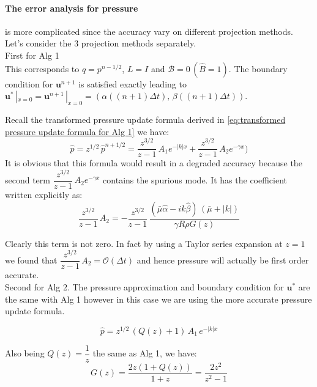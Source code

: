 \paragraph*{The error analysis for pressure} is more complicated since the accuracy vary on different projection methods. Let's consider the 3 projection methods separately.\\

First for Alg 1\\
This corresponds to $q = p^{n-1/2}$, $L = I$ and $\mathcal{B} = 0 \, (\hat{B} = 1)$. The boundary condition for $\textbf{u}^{n+1}$ is satisfied exactly leading to $\textbf{u}^*\,|_{x=0} = \textbf{u}^{n+1}\,|_{x=0} = (\alpha((n+1)\Delta t),\,\beta((n+1)\Delta t))$.

Recall the transformed pressure update formula derived in \eqref{eq:transformed pressure update formula for Alg 1} we have:
\begin{equation}
\hat{p} = z^{1/2}\,\hat{p}^{n+1/2} = \dfrac{z^{3/2}}{z-1}\, A_1 e^{-|k|x} + \dfrac{z^{3/2}}{z-1}\, A_2 e^{-\gamma x})
\end{equation}
It is obvious that this formula would result in a degraded accuracy because the second term $\dfrac{z^{3/2}}{z-1}\, A_2 e^{-\gamma x}$ contains the spurious mode. It has the coefficient written explicitly as:
\begin{equation*}
\dfrac{z^{3/2}}{z-1}\, A_2  = -\dfrac{z^{3/2}}{z-1}\,\dfrac{(\bar{\mu} \hat{\alpha} - ik \hat{\beta})\,(\bar{\mu} + |k|)}{\gamma R \rho G(z)}
\end{equation*}

Clearly this term is not zero. In fact by using a Taylor series expansion at $z=1$ we found that $\dfrac{z^{3/2}}{z-1}\,A_2 = \mathcal{O} (\Delta t)$ and hence pressure will actually be first order accurate.\\

Second for Alg 2. The pressure approximation and boundary condition for $\textbf{u}^*$ are the same with Alg 1 however in this case we are using the more accurate pressure update formula. 

\begin{dmath}
\hat{p} = z^{1/2}\,(Q(z) + 1)\,A_1\,e^{-|k|x}
\end{dmath}

Also being $Q(z) = \dfrac{1}{z}$ the same as Alg 1, we have:
\begin{equation*}
G(z) = \dfrac{2z(1+Q(z))}{1+z} = \dfrac{2z^2}{z^2 - 1}
\end{equation*}

